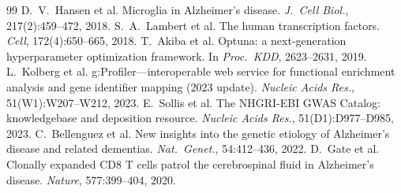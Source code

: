 \documentclass[10pt,twocolumn,letterpaper]{article}
\begin{document}
{\begin{thebibliography}{99}
 D.~V.~Hansen et al. Microglia in Alzheimer's disease. \emph{J.\ Cell Biol.}, 217(2):459--472, 2018.
 S.~A.~Lambert et al. The human transcription factors. \emph{Cell}, 172(4):650--665, 2018.
 T.~Akiba et al. Optuna: a next-generation hyperparameter optimization framework. In \emph{Proc.\ KDD}, 2623--2631, 2019.
 L.~Kolberg et al. g:Profiler---interoperable web service for functional enrichment analysis and gene identifier mapping (2023 update). \emph{Nucleic Acids Res.}, 51(W1):W207--W212, 2023.
 E.~Sollis et al. The NHGRI-EBI GWAS Catalog: knowledgebase and deposition resource. \emph{Nucleic Acids Res.}, 51(D1):D977--D985, 2023.
 C.~Bellenguez et al. New insights into the genetic etiology of Alzheimer's disease and related dementias. \emph{Nat.\ Genet.}, 54:412--436, 2022.
 D.~Gate et al. Clonally expanded CD8 T cells patrol the cerebrospinal fluid in Alzheimer's disease. \emph{Nature}, 577:399--404, 2020.
\end{thebibliography}}
\end{document}
